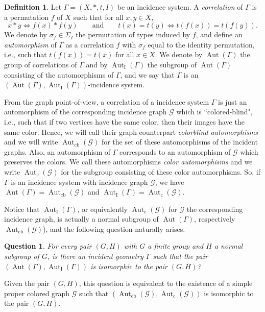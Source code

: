 \documentclass{amsart}
\newtheorem{question}[theorem]{Question}
\theoremstyle{definition}
\newtheorem{definition}[theorem]{Definition}
\theoremstyle{remark}
\newcommand{\Aut}{\operatorname{Aut}}
\newcommand{\AutI}{\Aut_{\text{I}}}
\newcommand{\Autcb}{\Aut_{\text{cb}}}
\newcommand{\Autc}{\Aut_{\text{c}}}
\newcommand{\G}{\mathcal{G}}
\begin{document}
\begin{definition}
Let $\Gamma=(X,\ast,t,I)$ be an incidence system. A \emph{correlation} of $\Gamma$ is a permutation $f$ of $X$ such that for all $x,y\in X$, 
\[ 
x\ast y\Leftrightarrow f(x)\ast f(y)\qquad \text{and}\qquad t(x)=t(y)\Leftrightarrow t(f(x))=t(f(y)).
\]
We denote by $\sigma_f\in \Sigma_I$ the permutation of types induced by $f$, and define an \emph{automorphism} of $\Gamma$ as a correlation $f$ with $\sigma_f$ equal to the identity permutation, i.e., such that $t(f(x))=t(x)$ for all $x\in X$. We denote by $\Aut(\Gamma)$ the group of correlations of $\Gamma$ and by $\AutI(\Gamma)$ the subgroup of $\Aut(\Gamma)$ consisting of the automorphisms of $\Gamma$, and we say that $\Gamma$ is an $(\Aut(\Gamma),\AutI(\Gamma))$-incidence system.
\end{definition}

From the graph point-of-view, a correlation of a incidence system $\Gamma$ is just an automorphism of the corresponding incidence graph $\G$ which is ``colored-blind", i.e., such that if two vertices have the same color, then their images have the same color.  Hence, we will call their graph counterpart \emph{colorblind automorphisms} and we will write $\Aut_{\text{cb}}(\G)$ for the set of these automorphisms of the incident graphs. Also, an automorphism of $\Gamma$ corresponds to an automorphism of $\G$ which preserves the colors. We call these automorphisms \emph{color automorphisms} and we write $\Autc(\G)$ for the subgroup consisting of these color automorphisms. So, if $\Gamma$ is an incidence system with incidence graph $\G$, we have $\Aut(\Gamma)=\Autcb(\G)$ and $\AutI(\Gamma)=\Autc(\G)$.

Notice that $\AutI(\Gamma)$, or equivalently $\Autc(\G)$ for $\G$ the corresponding incidence graph, is actually a normal subgroup of $\Aut(\Gamma)$, respectively $\Aut_{\text{cb}}(\G)$), and the following question naturally arises.

\begin{question}
For every pair $(G,H)$ with $G$ a finite group and $H$ a normal subgroup of $G$, is there an incident geometry $\Gamma$  such that the pair $(\Aut(\Gamma),\AutI(\Gamma))$ is isomorphic to the pair $(G,H)$? 
\end{question}

 Given the pair $(G,H)$, this question is equivalent to the existence of a simple proper colored graph $\mathcal{G}$ such that $(\Autcb(\G),\Autc(\G))$ is isomorphic to the pair $(G,H)$.
\end{document}
